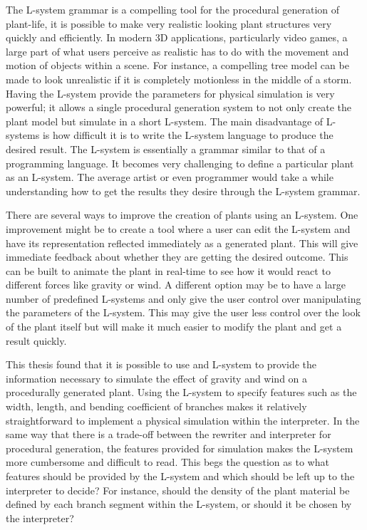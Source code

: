 The L-system grammar is a compelling tool for the procedural generation of plant-life, it is possible to make very realistic looking plant structures very quickly and efficiently. In modern 3D applications, particularly video games, a large part of what users perceive as realistic has to do with the movement and motion of objects within a scene. For instance, a compelling tree model can be made to look unrealistic if it is completely motionless in the middle of a storm. Having the L-system provide the parameters for physical simulation is very powerful; it allows a single procedural generation system to not only create the plant model but simulate in a short L-system. The main disadvantage of L-systems is how difficult it is to write the L-system language to produce the desired result. The L-system is essentially a grammar similar to that of a programming language. It becomes very challenging to define a particular plant as an L-system. The average artist or even programmer would take a while understanding how to get the results they desire through the L-system grammar. 

There are several ways to improve the creation of plants using an L-system. One improvement might be to create a tool where a user can edit the L-system and have its representation reflected immediately as a generated plant. This will give immediate feedback about whether they are getting the desired outcome. This can be built to animate the plant in real-time to see how it would react to different forces like gravity or wind. A different option may be to have a large number of predefined L-systems and only give the user control over manipulating the parameters of the L-system. This may give the user less control over the look of the plant itself but will make it much easier to modify the plant and get a result quickly.

This thesis found that it is possible to use and L-system to provide the information necessary to simulate the effect of gravity and wind on a procedurally generated plant. Using the L-system to specify features such as the width, length, and bending coefficient of branches makes it relatively straightforward to implement a physical simulation within the interpreter. In the same way that there is a trade-off between the rewriter and interpreter for procedural generation, the features provided for simulation makes the L-system more cumbersome and difficult to read. This begs the question as to what features should be provided by the L-system and which should be left up to the interpreter to decide? For instance, should the density of the plant material be defined by each branch segment within the L-system, or should it be chosen by the interpreter? 
